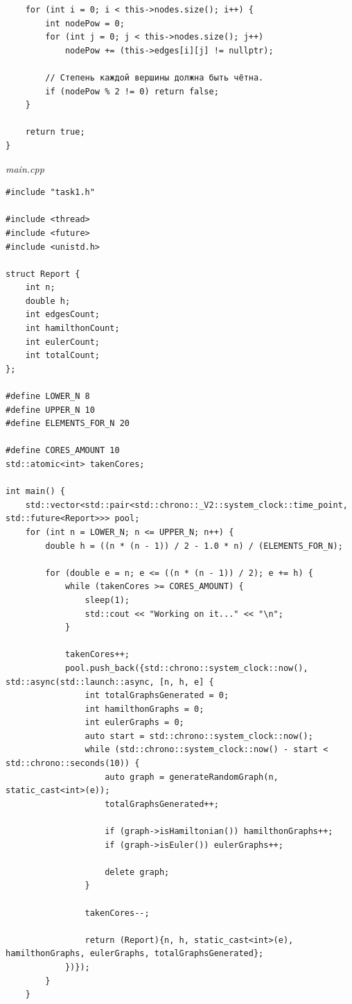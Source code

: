 \documentclass[a4paper,14pt]{extarticle}
\begin{document}
\begin{enumerate}[1.]
\begin{verbatim}
    for (int i = 0; i < this->nodes.size(); i++) {
        int nodePow = 0;
        for (int j = 0; j < this->nodes.size(); j++) 
            nodePow += (this->edges[i][j] != nullptr);

        // Степень каждой вершины должна быть чётна.
        if (nodePow % 2 != 0) return false;
    }

    return true;
}
\end{verbatim}

          \textit{main.cpp}
          \begin{verbatim}
#include "task1.h"

#include <thread>
#include <future>
#include <unistd.h>

struct Report {
    int n;
    double h;
    int edgesCount;
    int hamilthonCount;
    int eulerCount;
    int totalCount;
};

#define LOWER_N 8
#define UPPER_N 10
#define ELEMENTS_FOR_N 20

#define CORES_AMOUNT 10
std::atomic<int> takenCores;

int main() {
    std::vector<std::pair<std::chrono::_V2::system_clock::time_point, std::future<Report>>> pool;
    for (int n = LOWER_N; n <= UPPER_N; n++) {
        double h = ((n * (n - 1)) / 2 - 1.0 * n) / (ELEMENTS_FOR_N);
        
        for (double e = n; e <= ((n * (n - 1)) / 2); e += h) {
            while (takenCores >= CORES_AMOUNT) {
                sleep(1);
                std::cout << "Working on it..." << "\n";
            }

            takenCores++;
            pool.push_back({std::chrono::system_clock::now(), std::async(std::launch::async, [n, h, e] {
                int totalGraphsGenerated = 0;
                int hamilthonGraphs = 0;
                int eulerGraphs = 0;
                auto start = std::chrono::system_clock::now();
                while (std::chrono::system_clock::now() - start < std::chrono::seconds(10)) {
                    auto graph = generateRandomGraph(n, static_cast<int>(e));
                    totalGraphsGenerated++;

                    if (graph->isHamiltonian()) hamilthonGraphs++;
                    if (graph->isEuler()) eulerGraphs++;

                    delete graph;
                }

                takenCores--;

                return (Report){n, h, static_cast<int>(e), hamilthonGraphs, eulerGraphs, totalGraphsGenerated};
            })});
        }
    }




\end{verbatim}
\end{enumerate}
\end{document}
